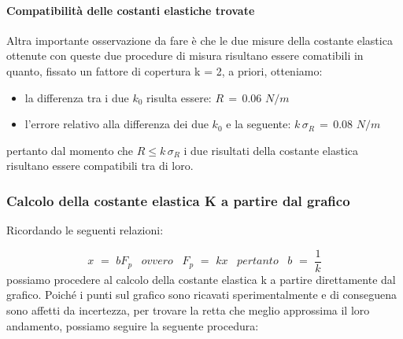 \paragraph{Compatibilità delle costanti elastiche trovate\\}
Altra importante osservazione da fare è che le due misure della costante elastica ottenute con queste due procedure di misura risultano essere comatibili in quanto, fissato un fattore di copertura k = 2, a priori, otteniamo:
\begin{itemize}
	\item{la differenza tra i due $k_0$ risulta essere: $R \,=\, 0.06 \,\, N/m$}
	\item{l'errore relativo alla differenza dei due $k_0$ e la seguente: $k \, \sigma_R \,=\, 0.08 \,\, N/m$}
\end{itemize}
pertanto dal momento che $ R \leq k \, \sigma_R$ i due risultati della costante elastica risultano essere compatibili tra di loro.

\subsubsection{Calcolo della costante elastica K a partire dal grafico}
Ricordando le seguenti relazioni:

\begin{equation}
	x \,\,=\,\, bF_p \,\,\,\,\,ovvero\,\,\,\,\, F_p \,\,=\,\, kx \,\,\,\,\,pertanto\,\,\,\,\, b \,\,=\,\, \frac{1}{k}
\end{equation}
%
possiamo procedere al calcolo della costante elastica k a partire direttamente dal grafico. Poiché i punti sul grafico sono ricavati sperimentalmente e di conseguena sono affetti da incertezza, per trovare la retta che meglio approssima il loro andamento, possiamo seguire la seguente procedura:


